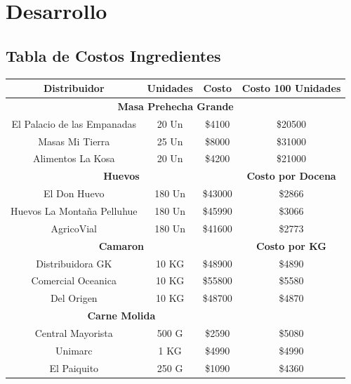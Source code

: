 \documentclass[12pt]{article}
\begin{document}
\section{Desarrollo} %

\subsection{Tabla de Costos Ingredientes}

\begin{table}[h!]
    \centering
    \begin{tabular}{|| c | c | c | c||} %
        \hline
    \textbf{Distribuidor} & Unidades & \textbf{Costo} & \textbf{Costo 100 Unidades} \\ [0.5ex]
        \hline\hline
        \multicolumn{4}{||c||}{\textbf{Masa Prehecha Grande}} \\ [0.5ex] \hline \hline
        El Palacio de las Empanadas & 20 Un & \$4100 & \$20500 \\ \hline
        Masas Mi Tierra & 25 Un & \$8000 & \$31000 \\ \hline
        Alimentos La Kosa & 20 Un & \$4200 & \$21000 \\ [1ex] \hline \hline

        \multicolumn{3}{||c||}{\textbf{Huevos}} & \textbf{Costo por Docena} \\ [0.5ex] \hline \hline
        El Don Huevo & 180 Un & \$43000 & \$2866 \\ \hline
        Huevos La Montaña Pelluhue & 180 Un & \$45990 & \$3066 \\ \hline
        AgricoVial & 180 Un & \$41600 & \$2773 \\ [1ex] \hline \hline

        \multicolumn{3}{||c|}{\textbf{Camaron}} & \textbf{Costo por KG} \\ [0.5ex] \hline \hline
        Distribuidora GK & 10 KG & \$48900 & \$4890 \\ \hline
        Comercial Oceanica & 10 KG & \$55800 & \$5580 \\ \hline
        Del Origen & 10 KG & \$48700 & \$4870 \\ [1ex] \hline \hline

        \multicolumn{3}{||c|}{\textbf{Carne Molida}} & \\ [0.5ex] \hline \hline
        Central Mayorista & 500 G & \$2590 & \$5080 \\ \hline \hline
        Unimarc & 1 KG & \$4990 & \$4990 \\ \hline \hline
        El Paiquito & 250 G & \$1090 & \$4360 \\ [1ex] \hline \hline



\end{tabular}
\end{table}
\end{document}
